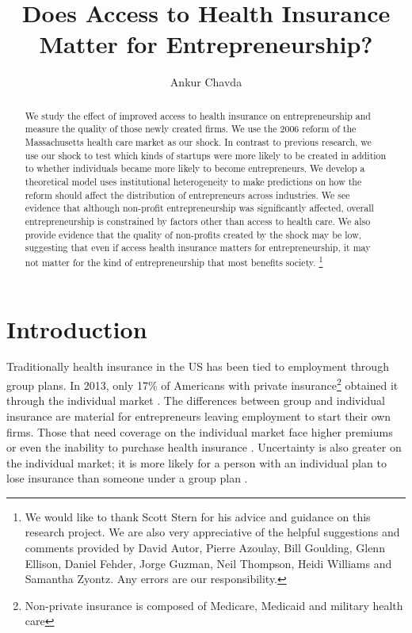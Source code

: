 \documentclass[12pt]{article}
\title{Does Access to Health Insurance Matter for Entrepreneurship?}
\author{Ankur Chavda}
\begin{document}
\maketitle

\begin{abstract}
We study the effect of improved access to health insurance on entrepreneurship and measure the quality of those newly created firms. We use the 2006 reform of the Massachusetts health care market as our shock. In contrast to previous research, we use our shock to test which kinds of startups were more likely to be created in addition to whether individuals became more likely to become entrepreneurs.  We develop a theoretical model uses institutional heterogeneity to make predictions on how the reform should affect the distribution of entrepreneurs across industries. We see evidence that although non-profit entrepreneurship was significantly affected, overall entrepreneurship is constrained by factors other than access to health care. We also provide evidence that the quality of non-profits created by the shock may be low, suggesting that even if access health insurance matters for entrepreneurship, it may not matter for the kind of entrepreneurship that most benefits society. \footnote{We would like to thank Scott Stern for his advice and guidance on this research project. We are also very appreciative of the helpful suggestions and comments provided by David Autor, Pierre Azoulay, Bill Goulding, Glenn Ellison, Daniel Fehder, Jorge Guzman, Neil Thompson, Heidi Williams and Samantha Zyontz. Any errors are our responsibility. }
\end{abstract}

\section{Introduction}
Traditionally health insurance in the US has been tied to employment through group plans. In 2013, only 17\% of Americans with private insurance\footnote{Non-private insurance is composed of Medicare, Medicaid and military health care} obtained it through the individual market \citep{smith2014health}. The differences between group and individual insurance are material for entrepreneurs leaving employment to start their own firms. Those that need coverage on the individual market face higher premiums or even the inability to purchase health insurance \citep{pollitz2001accessible}. Uncertainty is also greater on the individual market; it is more likely for a person with an individual plan to lose insurance than someone under a group plan \citep{pauly2008risky}. 
\end{document}
